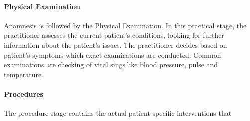 \paragraph{Physical Examination}
Anamnesis is followed by the Physical Examination.
In this practical stage, the practitioner assesses the current patient's conditions,
looking for further information about the patient's issues\cite{seidel2010mosby}.
The practitioner decides based on patient's symptoms which exact examinations are conducted.
Common examinations are checking of vital sings like blood pressure, pulse and temperature.

\paragraph{Procedures}
The procedure stage contains the actual patient-specific interventions that \todo

